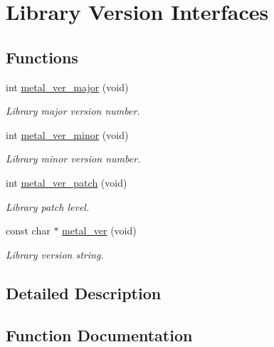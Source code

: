 \hypertarget{group__versions}{}\section{Library Version Interfaces}
\label{group__versions}
\subsection*{Functions}
\begin{DoxyCompactItemize}
\item 
int \hyperlink{group__versions_ga269febc3c3d38804d790339b3c9266c4}{metal\+\_\+ver\+\_\+major} (void)
\begin{DoxyCompactList}\small\item\em Library major version number. \end{DoxyCompactList}\item 
int \hyperlink{group__versions_ga373901f20ed1c78d65be47a1ca0d45e9}{metal\+\_\+ver\+\_\+minor} (void)
\begin{DoxyCompactList}\small\item\em Library minor version number. \end{DoxyCompactList}\item 
int \hyperlink{group__versions_ga2cc6ecf158e53a9b985b8d0933ebdaa8}{metal\+\_\+ver\+\_\+patch} (void)
\begin{DoxyCompactList}\small\item\em Library patch level. \end{DoxyCompactList}\item 
const char $\ast$ \hyperlink{group__versions_ga5161f07055c7dcfe30ae0bf749e8b189}{metal\+\_\+ver} (void)
\begin{DoxyCompactList}\small\item\em Library version string. \end{DoxyCompactList}\end{DoxyCompactItemize}


\subsection{Detailed Description}


\subsection{Function Documentation}
\mbox{\label{group__versions_ga5161f07055c7dcfe30ae0bf749e8b189}} 
